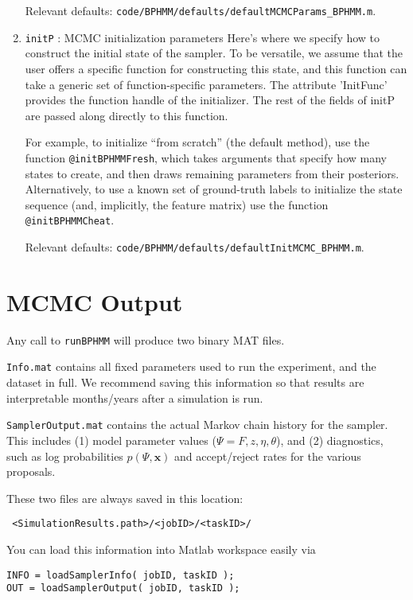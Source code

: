\documentclass[fontsize=12]{article}
\begin{document}
\begin{enumerate}
Relevant defaults: \texttt{code/BPHMM/defaults/defaultMCMCParams\_BPHMM.m}.

\item \texttt{initP} : MCMC initialization parameters
Here's where we specify how to construct the initial state of the sampler.  To be versatile, we assume that the user offers a specific function for constructing this state, and this function can take a generic set of function-specific parameters.  The attribute 'InitFunc' provides the function handle of the initializer.  The rest of the fields of initP are passed along directly to this function.

For example, to initialize ``from scratch'' (the default method), use the function \texttt{@initBPHMMFresh}, which takes arguments that specify how many states to create, and then draws remaining parameters from their posteriors.  Alternatively, to use a known set of ground-truth labels to initialize the state sequence (and, implicitly, the feature matrix) use the function \texttt{@initBPHMMCheat}.

Relevant defaults: \texttt{code/BPHMM/defaults/defaultInitMCMC\_BPHMM.m}.

\end{enumerate}


\section{ MCMC Output }

Any call to \texttt{runBPHMM} will produce two binary MAT files.

 \texttt{Info.mat} contains all fixed parameters used to run the experiment, and the dataset in full.  We recommend saving this information so that results are interpretable months/years after a simulation is run.
 
 \texttt{SamplerOutput.mat} contains the actual Markov chain history for the sampler.  This includes (1) model parameter values ($\Psi = F,z, \eta, \theta$), and (2) diagnostics, such as log probabilities $p( \Psi , \mathbf{x} )$ and accept/reject rates for the various proposals.

These two files are always saved in this location:

\texttt{ <SimulationResults.path>/<jobID>/<taskID>/ }

You can load this information into Matlab workspace easily via

\begin{verbatim}
INFO = loadSamplerInfo( jobID, taskID );
OUT = loadSamplerOutput( jobID, taskID );
\end{verbatim}
\end{document}
